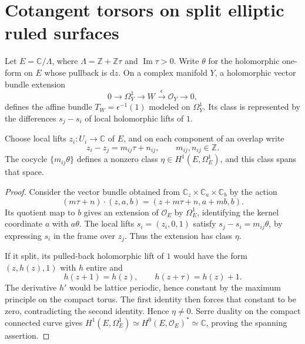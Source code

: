 \section{Cotangent torsors on split elliptic ruled surfaces}
\label{sec:elliptic-cotangent-torsor-classes}

Let $E=\mathbb C/\Lambda$, where $\Lambda=\mathbb Z+\mathbb Z\tau$ and $\operatorname{Im}\tau>0$. Write $\theta$ for the holomorphic one-form on $E$ whose pullback is $\mathrm{d}z$. On a complex manifold $Y$, a holomorphic vector bundle extension
\[
 0\longrightarrow\Omega_Y^1\longrightarrow W
       \xrightarrow{\epsilon}\mathcal O_Y\longrightarrow0,
\]
defines the affine bundle $T_W=\epsilon^{-1}(1)$ modeled on $\Omega_Y^1$. Its class is represented by the differences $s_j-s_i$ of local holomorphic lifts of $1$.

\begin{lemma}\label{lem:elliptic-additive-class}
Choose local lifts $z_i:U_i\to\mathbb C$ of $E$, and on each component of an overlap write
\[
 z_i-z_j=m_{ij}\tau+n_{ij},\qquad m_{ij},n_{ij}\in\mathbb Z.
\]
The cocycle $\{m_{ij}\theta\}$ defines a nonzero class $\eta\in H^1(E,\Omega_E^1)$, and this class spans that space.
\end{lemma}
\begin{proof}
Consider the vector bundle obtained from $\mathbb C_z\times\mathbb C_a\times\mathbb C_b$ by the action
\[
 (m\tau+n)\cdot(z,a,b)=(z+m\tau+n,a+mb,b).
\]
Its quotient map to $b$ gives an extension of $\mathcal O_E$ by $\Omega_E^1$, identifying the kernel coordinate $a$ with $a\theta$. The local lifts $s_i=(z_i,0,1)$ satisfy $s_j-s_i=m_{ij}\theta$, by expressing $s_i$ in the frame over $z_j$. Thus the extension has class $\eta$.

If it split, its pulled-back holomorphic lift of $1$ would have the form $(z,h(z),1)$ with $h$ entire and
\[
 h(z+1)=h(z),\qquad h(z+\tau)=h(z)+1.
\]
The derivative $h'$ would be lattice periodic, hence constant by the maximum principle on the compact torus. The first identity then forces that constant to be zero, contradicting the second identity. Hence $\eta\ne0$. Serre duality on the compact connected curve gives $H^1(E,\Omega_E^1)\simeq H^0(E,\mathcal O_E)^*\simeq\mathbb C$, proving the spanning assertion.
\end{proof}

